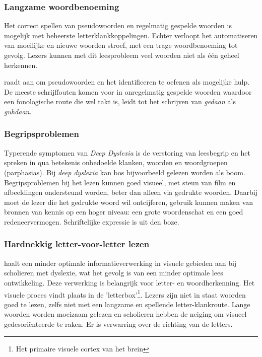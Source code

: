 \subsubsection{Langzame woordbenoeming}

Het correct spellen van pseudowoorden en regelmatig gespelde woorden is mogelijk met beheerste letterklankkoppelingen. Echter verloopt het automatiseren van moeilijke en nieuwe woorden stroef, met een trage woordbenoeming tot gevolg. Lezers kunnen met dit leesprobleem veel woorden niet als één geheel herkennen. 

\textcite{Filipak2020} raadt aan om pseudowoorden en het identificeren te oefenen als mogelijke hulp. De meeste schrijffouten komen voor in onregelmatig gespelde woorden waardoor een fonologische route die wel takt is, leidt tot het schrijven van \textit{gedaan} als \textit{guhdaan}.


\subsubsection{Begripsproblemen}

Typerende symptomen van \textit{Deep Dyslexia} is de verstoring van leesbegrip en het spreken in qua betekenis onbedoelde klanken, woorden en woordgroepen (parphasias). Bij \textit{deep dyslexia} kan bos bijvoorbeeld gelezen worden als boom. Begripsproblemen bij het lezen kunnen goed visueel, met steun van film en afbeeldingen ondersteund worden, beter dan alleen via gedrukte woorden. Daarbij moet de lezer die het gedrukte woord wil ontcijferen, gebruik kunnen maken van bronnen van kennis op een hoger niveau: een grote woordenschat en een goed redeneervermogen. Schriftelijke expressie is uit den boze.

\subsubsection{Hardnekkig letter-voor-letter lezen}

\textcite{Bonte2020} haalt een minder optimale informatieverwerking in visuele gebieden aan bij scholieren met dyslexie, wat het gevolg is van een minder optimale lees ontwikkeling. Deze verwerking is belangrijk voor letter- en woordherkenning. Het visuele proces vindt plaats in de 'letterbox'\footnote{Het primaire visuele cortex van het brein}. Lezers zijn niet in staat woorden goed te lezen, zelfs niet met een langzame en spellende letter-klankroute. Lange woorden worden moeizaam gelezen en scholieren hebben de neiging om visueel gedesoriënteerde te raken. Er is verwarring over de richting van de letters.

